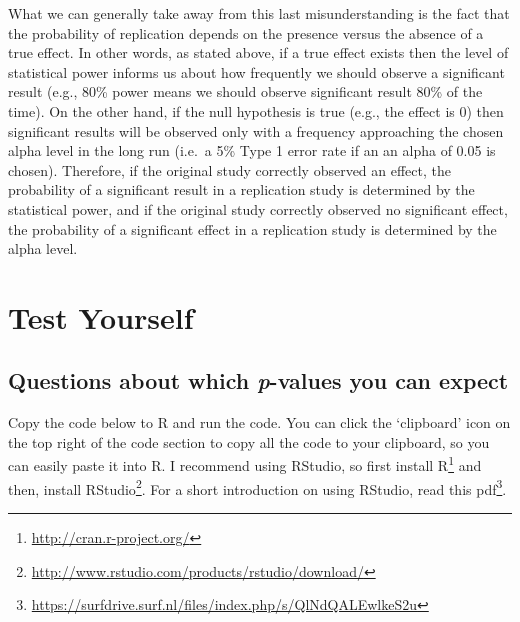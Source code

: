 \documentclass[
  oneside]{krantz}
\renewcommand{\href}[2]{#2\footnote{\url{#1}}}
\begin{document}
What we can generally take away from this last misunderstanding is the fact that the probability of replication depends on the presence versus the absence of a true effect. In other words, as stated above, if a true effect exists then the level of statistical power informs us about how frequently we should observe a significant result (e.g., 80\% power means we should observe significant result 80\% of the time). On the other hand, if the null hypothesis is true (e.g., the effect is 0) then significant results will be observed only with a frequency approaching the chosen alpha level in the long run (i.e.~a 5\% Type 1 error rate if an an alpha of 0.05 is chosen). Therefore, if the original study correctly observed an effect, the probability of a significant result in a replication study is determined by the statistical power, and if the original study correctly observed no significant effect, the probability of a significant effect in a replication study is determined by the alpha level.

\hypertarget{test-yourself}{%
\section{Test Yourself}\label{test-yourself}}

\hypertarget{questions-about-which-p-values-you-can-expect}{%
\subsection{\texorpdfstring{Questions about which \emph{p}-values you can expect}{Questions about which p-values you can expect}}\label{questions-about-which-p-values-you-can-expect}}

Copy the code below to R and run the code. You can click the `clipboard' icon on the top right of the code section to copy all the code to your clipboard, so you can easily paste it into R. I recommend using RStudio, so first install \href{http://cran.r-project.org/}{R} and then, install \href{http://www.rstudio.com/products/rstudio/download/}{RStudio}. For a short introduction on using RStudio, read \href{https://surfdrive.surf.nl/files/index.php/s/QlNdQALEwlkeS2u}{this pdf}.
\end{document}
